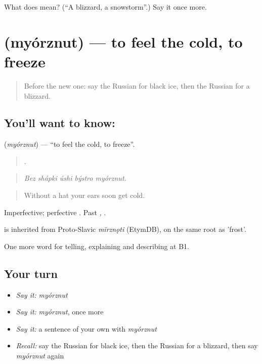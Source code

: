 \begin{tcolorbox}[breakable,colback=teal!4,colframe=teal!35!black,title={Before you move on}]
What does  mean? (\textquotedblleft{}A blizzard, a snowstorm\textquotedblright{}.) Say it once more.
\end{tcolorbox}
\section[\texorpdfstring{\ru{мёрзнуть} (myórznut)}{мёрзнуть (myórznut)}]{ (myórznut) — to feel the cold, to freeze}

\label{lesson:RU-C467-myorznut}



\begin{quote}
Before the new one: say the Russian for black ice, then the Russian for a blizzard.
\end{quote}

\subsection*{You'll want to know: }
\textbf{} (\emph{myórznut}) — \textquotedblleft{}to feel the cold, to freeze\textquotedblright{}.

\begin{quote}
    .
\end{quote}

\begin{quote}
\emph{Bez shápki úshi býstro myórznut.}
\end{quote}

\begin{quote}
Without a hat your ears soon get cold.
\end{quote}

Imperfective; perfective \emph{}. Past \emph{, }.

\begin{cousinweb}
\emph{} is inherited from Proto-Slavic \emph{mĭrznǫti} (EtymDB), on the same root as \emph{} 'frost'.
\end{cousinweb}

\begin{grammarlens}[title={What you've built}]
One more word for telling, explaining and describing at B1.
\end{grammarlens}

\subsection*{Your turn}
\begin{itemize}
\raggedright
  \item \emph{Say it:} \emph{myórznut}
  \item \emph{Say it:} \emph{myórznut}, once more
  \item \emph{Say it:} a sentence of your own with \emph{myórznut}
  \item \emph{Recall:} say the Russian for black ice, then the Russian for a blizzard, then say \emph{myórznut} again
\end{itemize}

